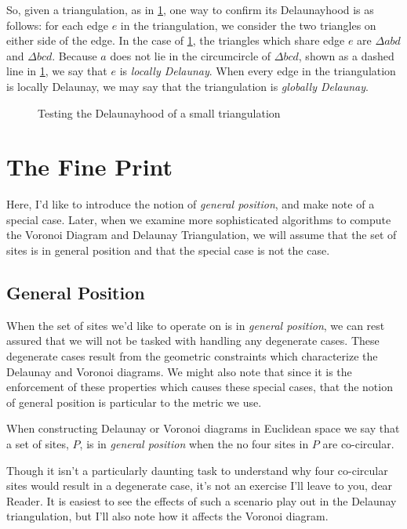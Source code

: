 \documentclass[12pt,twoside]{reedthesis}
\begin{document}
    So, given a triangulation, as in \cref{fig:delaunayhood_small}, one way to confirm its Delaunayhood is as follows: for each edge $e$ in the triangulation, we consider the two triangles on either side of the edge.  In the case of \cref{fig:delaunayhood_small}, the triangles which share edge $e$ are $\Delta abd$ and $\Delta bcd$. Because $a$ does not lie in the circumcircle of $\Delta bcd$, shown as a dashed line in \cref{fig:delaunayhood_small}, we say that $e$ is \emph{locally Delaunay}. When every edge in the triangulation is locally Delaunay, we may say that the triangulation is \emph{globally Delaunay}.

    \begin{figure}[!htb]
      \centering
      
      \caption{Testing the Delaunayhood of a small triangulation}
      \label{fig:delaunayhood_small}
    \end{figure}

  \section{The Fine Print}
  \label{sec:the_fine_print}
    Here, I'd like to introduce the notion of \emph{general position}, and make note of a special case. Later, when we examine more sophisticated algorithms to compute the Voronoi Diagram and Delaunay Triangulation, we will assume that the set of sites is in general position and that the special case is not the case.
    \subsection{General Position} %
    \label{sub:general_position}
    
      When the set of sites we'd like to operate on is in \emph{general position}, we can rest assured that we will not be tasked with handling any degenerate cases. These degenerate cases result from the geometric constraints which characterize the Delaunay and Voronoi diagrams. We might also note that since it is the enforcement of these properties which causes these special cases, that the notion of general position is particular to the metric we use.\par

      When constructing Delaunay or Voronoi diagrams in Euclidean space we say that a set of sites, $P$, is in \emph{general position} when the no four sites in $P$ are co-circular.

      Though it isn't a particularly daunting task to understand why four co-circular sites would result in a degenerate case, it's not an exercise I'll leave to you, dear Reader. It is easiest to see the effects of such a scenario play out in the Delaunay triangulation, but I'll also note how it affects the Voronoi diagram. \par
\end{document}
